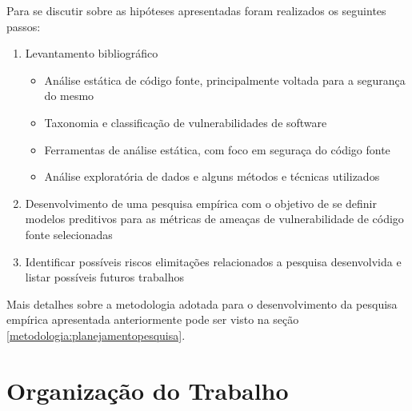 Para se discutir sobre as hipóteses apresentadas foram realizados os seguintes
passos:

\begin{enumerate}
  \item Levantamento bibliográfico
    \begin{itemize}
      \item Análise estática de código fonte, principalmente voltada para a
        segurança do mesmo
      \item Taxonomia e classificação de vulnerabilidades de software
      \item Ferramentas de análise estática, com foco em seguraça do código
        fonte
      \item Análise exploratória de dados e alguns métodos e técnicas utilizados
    \end{itemize}

  \item Desenvolvimento de uma pesquisa empírica com o objetivo de se definir
    modelos preditivos para as métricas de ameaças de vulnerabilidade de código
    fonte selecionadas

  \item Identificar possíveis riscos elimitações relacionados a pesquisa
    desenvolvida e listar possíveis futuros trabalhos
\end{enumerate}

Mais detalhes sobre a metodologia adotada para o desenvolvimento da pesquisa
empírica apresentada anteriormente pode ser visto na seção
\ref{metodologia:planejamentopesquisa}.

\section{Organização do Trabalho}

